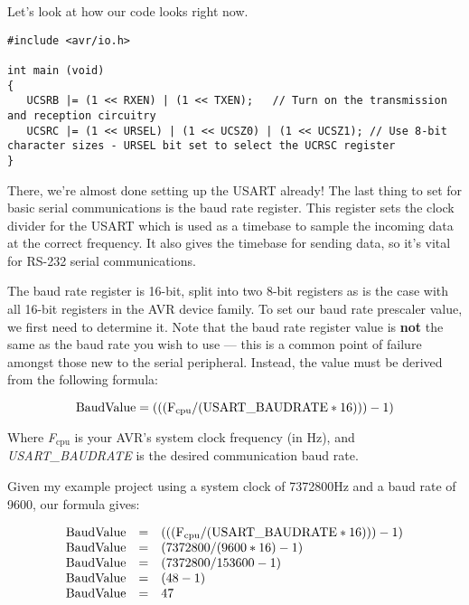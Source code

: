 \documentclass[a4paper,oneside]{book}
\newcommand{\subscript}[1]{\ensuremath{_{\textrm{#1}}}}
\begin{document}
Let's look at how our code looks right now.

\begin{center}
\begin{lstlisting}
#include <avr/io.h>

int main (void)
{
   UCSRB |= (1 << RXEN) | (1 << TXEN);   // Turn on the transmission and reception circuitry
   UCSRC |= (1 << URSEL) | (1 << UCSZ0) | (1 << UCSZ1); // Use 8-bit character sizes - URSEL bit set to select the UCRSC register
}
\end{lstlisting}
\end{center}

There, we're almost done setting up the USART already! The last thing to set for basic serial communications is the baud rate register. This register sets the clock divider for the USART which is used as a timebase to sample the incoming data at the correct frequency. It also gives the timebase for sending data, so it's vital for RS-232 serial communications.

The baud rate register is 16-bit, split into two 8-bit registers as is the case with all 16-bit registers in the AVR device family. To set our baud rate prescaler value, we first need to determine it. Note that the baud rate register value is \textbf{not} the same as the baud rate you wish to use --- this is a common point of failure amongst those new to the serial peripheral. Instead, the value must be derived from the following formula:

\begin{displaymath}
    \text{BaudValue} = (((\text{F\subscript{cpu}} / (\text{USART\_BAUDRATE} * 16))) - 1)
\end{displaymath}

Where \emph{F\subscript{cpu}} is your AVR's system clock frequency (in Hz), and \emph{USART\_BAUDRATE} is the desired communication baud rate.

Given my example project using a system clock of 7372800Hz and a baud rate of 9600, our formula gives:

\begin{displaymath}
\begin{array}{rcl}
    \text{BaudValue} & = & (((\text{F\subscript{cpu}} / (\text{USART\_BAUDRATE} * 16))) - 1) \\
    \text{BaudValue} & = & (7372800 / (9600 * 16) - 1) \\
    \text{BaudValue} & = & (7372800 / 153600 - 1) \\
    \text{BaudValue} & = & (48 - 1) \\
    \text{BaudValue} & = & 47 \\
\end{array}
\end{displaymath}
\end{document}
